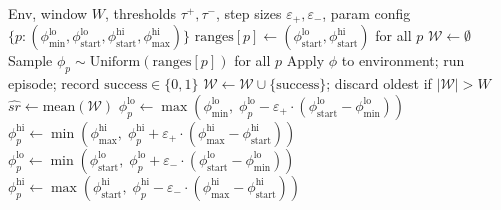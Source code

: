 
\begin{algorithm}[t]
\caption{Curriculum Domain Randomisation (CDR)}
\label{alg:cdr}
\begin{algorithmic}[1]
\Require Env, window $W$, thresholds $\tau^+, \tau^-$,
         step sizes $\varepsilon_+, \varepsilon_-$,
         param config $\{p: (\phi^\text{lo}_\text{min},
         \phi^\text{lo}_\text{start},
         \phi^\text{hi}_\text{start},
         \phi^\text{hi}_\text{max})\}$
\State $\text{ranges}[p] \gets (\phi^\text{lo}_\text{start},
       \phi^\text{hi}_\text{start})$ for all $p$
\State $\mathcal{W} \gets \emptyset$ 
  \State Sample $\phi_p \sim \text{Uniform}(\text{ranges}[p])$ for all $p$
  \State Apply $\phi$ to environment; run episode; record $\text{success} \in \{0,1\}$
  \State $\mathcal{W} \gets \mathcal{W} \cup \{\text{success}\}$;
         discard oldest if $|\mathcal{W}| > W$
    \State $\hat{sr} \gets \text{mean}(\mathcal{W})$
     
        \State $\phi^\text{lo}_p \gets \max(\phi^\text{lo}_\text{min},\;
               \phi^\text{lo}_p - \varepsilon_+ \cdot
               (\phi^\text{lo}_\text{start} - \phi^\text{lo}_\text{min}))$
        \State $\phi^\text{hi}_p \gets \min(\phi^\text{hi}_\text{max},\;
               \phi^\text{hi}_p + \varepsilon_+ \cdot
               (\phi^\text{hi}_\text{max} - \phi^\text{hi}_\text{start}))$
      \EndFor
     
        \State $\phi^\text{lo}_p \gets \min(\phi^\text{lo}_\text{start},\;
               \phi^\text{lo}_p + \varepsilon_- \cdot
               (\phi^\text{lo}_\text{start} - \phi^\text{lo}_\text{min}))$
        \State $\phi^\text{hi}_p \gets \max(\phi^\text{hi}_\text{start},\;
               \phi^\text{hi}_p - \varepsilon_- \cdot
               (\phi^\text{hi}_\text{max} - \phi^\text{hi}_\text{start}))$
      \EndFor
    \EndIf
  \EndIf
\EndFor
\end{algorithmic}
\end{algorithm}